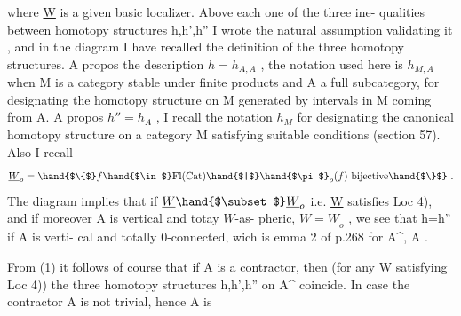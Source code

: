 where \uline{W} is a given basic localizer. Above each one of the three  ine-%
qualities between homotopy structures h,h',h'' I wrote the natural 
assumption  validating it , and  in the diagram I have
recalled the definition of the three homotopy structures. A propos
the description $h = h_{A\hat{},A}$ , the notation used here is $h_{M,A}$ when
M is a category stable under finite products and A a full subcategory,
for designating the homotopy structure on M generated by intervals in
M coming from A. A propos $h'' = h_{A\hat{}}$ , I recall the notation $h_M$ for
designating the canonical homotopy structure on a category M satisfying
suitable conditions (section 57). Also I recall
\[ \underline{W}_o = \hand{$\{$} f\hand{$\in$}\mathrm{Fl}(\mathrm{Cat}) \hand{$|$} \hand{$\pi$}_o(f) \text{ bijective}\hand{$\}$} \ . \]
The diagram implies that if $\underline{W}\hand{$\subset$}\underline{W}_o$ i.e. \uline{W} satisfies Loc 4), and if
moreover A is vertical and  totay $\underline{W}$-as-%
pheric,  
 $\underline{W} = \underline{W}_o$ , we see that h=h'' if A is verti-%
cal and totally 0-connected, wich is emma 2 of p.268 for A\^{}, A .

From (1) it follows of course that if A is a contractor, then
(for any \uline{W} satisfying Loc 4)) the three homotopy structures h,h',h''
on A\^{} coincide. In case the contractor A is not trivial, hence A is

